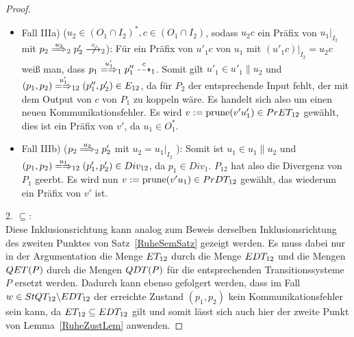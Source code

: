 \begin{proof}
\begin{itemize}
\begin{itemize}
        \item Fall IIIa) \big($u_2\in (O_1\cap I_2)^*,c\in (O_1\cap I_2)$,
          sodass $u_2c$ ein Präfix von $u_1|_{I_2}$ mit $p_2\weakmust[u_2]_2
          p'_2 \nmust[c]_2$\big): Für ein Präfix von $u'_1c$ von $u_1$ mit
          $(u'_1c)|_{I_2}=u_2c$ weiß man, dass $p_1\weakmay[u'_1]_1 p''_1
          \may[c]_1$. Somit gilt $u'_1\in u'_1\|u_2$ und $(p_1,p_2)
          \weakmay[u'_1]_{12} (p''_1,p'_2)\in E_{12}$, da für $P_2$ der
          entsprechende Input fehlt, der mit dem Output von $c$ von $P_1$ zu
          koppeln wäre. Es handelt sich also um einen neuen
          Kommunikationsfehler. Es wird $v:=\mathrm{prune} (v'u'_1) \in PrET _{12}$
          gewählt, dies ist ein Präfix von $v'$, da $u_1\in O^*_1$.
        \item Fall IIIb) \big($p_2\weakmust[u_2]_2 p'_2$ mit $u_2=u_1|_{I_2}$
          \big): Somit ist $u_1\in u_1\|u_2$ und $(p_1,p_2)\weakmay[u_1]_{12}
          (p'_1,p'_2)\in Div _{12}$, da $p_1\in Div _1$. $P_{12}$ hat also die
          Divergenz von $P_1$ geerbt. Es wird nun $v:=\mathrm{prune} (v'u_1)\in PrDT
          _{12}$ gewählt, das wiederum ein Präfix von $v'$ ist.
      \end{itemize}
  \end{itemize}

  2. \glqq$\subseteq$\grqq{}:\\
  Diese Inklusionsrichtung kann analog zum Beweis derselben Inklusionsrichtung
  des zweiten Punktes von Satz~\ref{RuheSemSatz} gezeigt werden. Es muss dabei
  nur in der Argumentation die Menge $ET _{12}$ durch die Menge $EDT _{12}$
  und die Mengen $QET (P)$ durch die Mengen $QDT (P)$ für die entsprechenden
  Transitionssysteme $P$ ersetzt werden. Dadurch kann ebenso gefolgert werden,
  dass im Fall $w\in StQT _{12}\backslash EDT _{12}$ der erreichte Zustand
  $(p_1,p_2)$ kein Kommunikationsfehler sein kann, da $ET _{12}\subseteq EDT
  _{12}$ gilt und somit lässt sich auch hier der zweite Punkt von
  Lemma~\ref{RuheZustLem} anwenden.


\end{proof}
